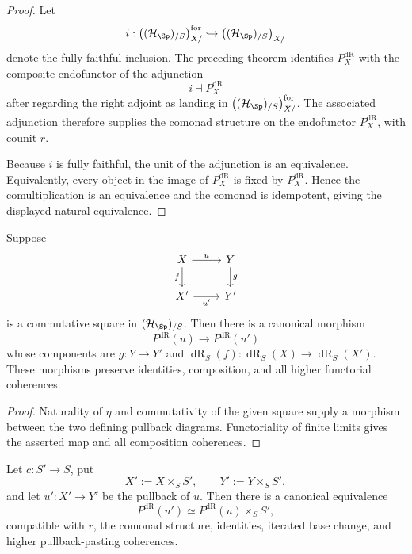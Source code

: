 \begin{proof}
Let
\[
    i:
    \bigl((\mathcal H_{\Sp})_{/S}\bigr)_{X/}^{\mathrm{for}}
    \hookrightarrow
    \bigl((\mathcal H_{\Sp})_{/S}\bigr)_{X/}
\]
denote the fully faithful inclusion.  The preceding theorem identifies
$P_X^{\mathrm{dR}}$ with the composite endofunctor of the adjunction
\[
    i\dashv P_X^{\mathrm{dR}}
\]
after regarding the right adjoint as landing in
$\bigl((\mathcal H_{\Sp})_{/S}\bigr)_{X/}^{\mathrm{for}}$.  The associated adjunction therefore
supplies the comonad structure on the endofunctor $P_X^{\mathrm{dR}}$, with counit
$r$.

Because $i$ is fully faithful, the unit of the adjunction is an equivalence.
Equivalently, every object in the image of $P_X^{\mathrm{dR}}$ is fixed by $P_X^{\mathrm{dR}}$.  Hence
the comultiplication is an equivalence and the comonad is idempotent, giving
the displayed natural equivalence.
\end{proof}

\begin{proposition}
\label{prop:centred-formalization-varying-centre}
Suppose
\[
\begin{tikzcd}
X \arrow[r,"u"] \arrow[d,"f"'] &
Y \arrow[d,"g"]\\
X' \arrow[r,"u'"'] &
Y'
\end{tikzcd}
\]
is a commutative square in $(\mathcal H_{\Sp})_{/S}$.  Then there is a canonical morphism
\[
    P^{\mathrm{dR}}(u)
    \longrightarrow
    P^{\mathrm{dR}}(u')
\]
whose components are $g:Y\to Y'$ and
$\operatorname{dR}_S(f):\operatorname{dR}_S(X)\to \operatorname{dR}_S(X')$.  These morphisms preserve identities,
composition, and all higher functorial coherences.
\end{proposition}

\begin{proof}
Naturality of $\eta$ and commutativity of the given square supply a morphism
between the two defining pullback diagrams.  Functoriality of finite limits
gives the asserted map and all composition coherences.
\end{proof}

\begin{proposition}
\label{prop:centred-formalization-base-change}
Let $c:S'\to S$, put
\[
    X':=X\times_SS',
    \qquad
    Y':=Y\times_SS',
\]
and let $u':X'\to Y'$ be the pullback of $u$.  Then there is a canonical
equivalence
\[
    P^{\mathrm{dR}}(u')
    \simeq
    P^{\mathrm{dR}}(u)\times_SS',
\]
compatible with $r$, the comonad structure, identities, iterated base
change, and higher pullback-pasting coherences.
\end{proposition}

